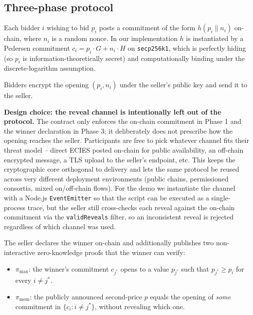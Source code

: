 \documentclass[11pt,a4paper]{article}
\begin{document}
\subsection{Three-phase protocol}

\begin{description}[leftmargin=1em,style=nextline]
\item[Phase 1 -- Commit (on-chain).]
Each bidder $i$ wishing to bid $p_i$ posts a commitment of the form
$h(p_i \| n_i)$ on-chain, where $n_i$ is a random nonce. In our implementation
$h$ is instantiated by a Pedersen commitment $c_i = p_i\cdot G + n_i\cdot H$
on \texttt{secp256k1}, which is perfectly hiding (so $p_i$ is information-theoretically secret)
and computationally binding under the discrete-logarithm assumption.

\item[Phase 2 -- Reveal to seller (encrypted).]
Bidders encrypt the opening $(p_i, n_i)$ under the seller's public key and
send it to the seller.

\textbf{Design choice: the reveal channel is intentionally left out of the
protocol.} The contract only enforces the on-chain commitment in Phase 1 and
the winner declaration in Phase 3; it deliberately does not prescribe how the
opening reaches the seller. Participants are free to pick whatever channel
fits their threat model -- direct ECIES posted on-chain for public
availability, an off-chain encrypted message, a TLS upload to the seller's
endpoint, etc. This keeps the cryptographic core orthogonal to delivery and
lets the same protocol be reused across very different deployment
environments (public chains, permissioned consortia, mixed on/off-chain
flows). For the demo we instantiate the channel with a Node.js
\texttt{EventEmitter} so that the script can be executed as a single-process
trace, but the seller still cross-checks each reveal against the on-chain
commitment via the \texttt{validReveals} filter, so an inconsistent reveal is
rejected regardless of which channel was used.

\item[Phase 3 -- Settle (zero-knowledge).]
The seller declares the winner on-chain and additionally publishes two
non-interactive zero-knowledge proofs that the winner can verify:
\begin{itemize}[leftmargin=*,nosep]
\item $\pi_{\max}$: the winner's commitment $c_{j^*}$ opens to a value
$p_{j^*}$ such that $p_{j^*} \geq p_i$ for every $i \neq j^*$.
\item $\pi_{\mathrm{mem}}$: the publicly announced second-price $p$ equals
the opening of \emph{some} commitment in
$\{c_i : i \neq j^*\}$, without revealing which one.
\end{itemize}
\end{description}
\end{document}
